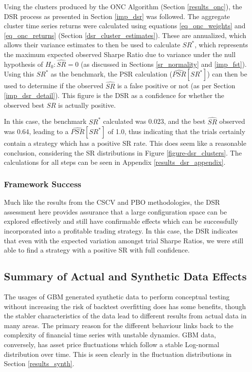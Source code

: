 \documentclass[a4paper,11pt,oneside]{article}
\theoremstyle{plain}
\theoremstyle{definition}
\begin{document}
	Using the clusters produced by the ONC Algorithm (Section \ref{results_onc}), the DSR process as presented in Section \ref{imp_dsr} was followed. The aggregate cluster time series returns were calculated using equations \ref{eq_onc_weights} and \ref{eq_onc_returns} (Section \ref{dsr_cluster_estimates}). These are annualized, which allows their variance estimates to then be used to calculate $SR^*$, which represents the maximum expected observed Sharpe Ratio due to variance under the null hypothesis of $H_0:  \widehat{SR} = 0$ (as discussed in Sections \ref{sr_normality} and \ref{imp_fst}). Using this $SR^*$ as the benchmark, the PSR calculation ($\widehat{PSR}[SR^*]$) can then be used to determine if the observed $\widehat{SR}$ is a false positive or not (as per Section \ref{imp_dsr_detail}). This figure is the DSR as a confidence for whether the observed best $SR$ is actually positive. \newline
	
	In this case, the benchmark $SR^*$ calculated was 0.023, and the best $\widehat{SR}$ observed was 0.64, leading to a $\widehat{PSR}[SR^*]$ of 1.0, thus indicating that the trials certainly contain a strategy which has a positive SR rate. This does seem like a reasonable conclusion, considering the SR distributions in Figure \ref{figure-dsr_clusters}. The calculations for all steps can be seen in Appendix \ref{results_dsr_appendix}. \newline

	\subsubsection{Framework Success}
	
	Much like the results from the CSCV and PBO methodologies, the DSR assessment here provides assurance that a large configuration space can be explored effectively and still have confirmable effects which can be successfully incorporated into a profitable trading strategy. In this case, the DSR indicates that even with the expected variation amongst trial Sharpe Ratios, we were still able to find a strategy with a positive SR with full confidence.

	
	\newpage
	\subsection{Summary of Actual and Synthetic Data Effects}\label{results_synth_summary}
	
		The usages of GBM generated synthetic data to perform conceptual testing without increasing the risk of backtest overfitting does has some benefits, though the stabler characteristics of the data lead to different results from actual data in many areas. The primary reason for the different behaviour links back to the complexity of financial time series with unstable dynamics. GBM data, conversely, has asset price fluctuations which follow a stable Log-normal distribution over time. This is seen clearly in the fluctuation distributions in Section \ref{results_synth}. \newline
		
\end{document}
